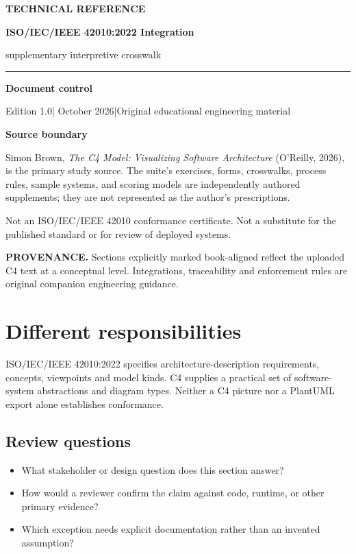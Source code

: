 \documentclass[10pt,letterpaper]{article}
\newcommand{\SourceNote}[1]{\par\smallskip\noindent\colorbox{C4Light}{\parbox{0.94\linewidth}{\footnotesize\textbf{PROVENANCE.} #1}}\par\medskip}
\newcommand{\DocStart}[3]{%
\begin{document}
\begin{titlepage}
\renewcommand{\thepage}{title-\arabic{page}}
\vspace*{0.55in}
{\sffamily\bfseries\small\color{C4Teal}#1}\par\vspace{0.24in}
{\sffamily\bfseries\fontsize{26}{31}\selectfont\color{C4Navy}#2}\par\vspace{0.18in}
{\large\color{C4Gray}#3}\par\vspace{0.4in}
\textcolor{C4Teal}{\rule{\linewidth}{1.15pt}}\par\vspace{0.24in}
\textbf{Document control}\par
Edition 1.0\quad|\quad 30 October 2026\quad|\quad Original educational engineering material\par
\vspace{0.17in}
\textbf{Source boundary}\par
Simon Brown, \emph{The C4 Model: Visualizing Software Architecture} (O'Reilly, 2026), is the primary study source. The suite's exercises, forms, crosswalks, process rules, sample systems, and scoring models are independently authored supplements; they are not represented as the author's prescriptions.\par
\vfill
{\small\color{C4Gray}Not an ISO/IEC/IEEE 42010 conformance certificate. Not a substitute for the published standard or for review of deployed systems.}\par
\end{titlepage}
}
\DocStart{TECHNICAL REFERENCE}{ISO/IEC/IEEE 42010:2022 Integration}{supplementary interpretive crosswalk}
\tableofcontents\clearpage
\SourceNote{Sections explicitly marked book-aligned reflect the uploaded C4 text at a conceptual level. Integrations, traceability and enforcement rules are original companion engineering guidance.}
\section{Different responsibilities}
ISO/IEC/IEEE 42010:2022 specifies architecture-description requirements, concepts, viewpoints and model kinds. C4 supplies a practical set of software-system abstractions and diagram types. Neither a C4 picture nor a PlantUML export alone establishes conformance.


\subsection{Review questions}
\begin{itemize}
\item What stakeholder or design question does this section answer?
\item How would a reviewer confirm the claim against code, runtime, or other primary evidence?
\item Which exception needs explicit documentation rather than an invented assumption?
\end{itemize}
\end{document}

